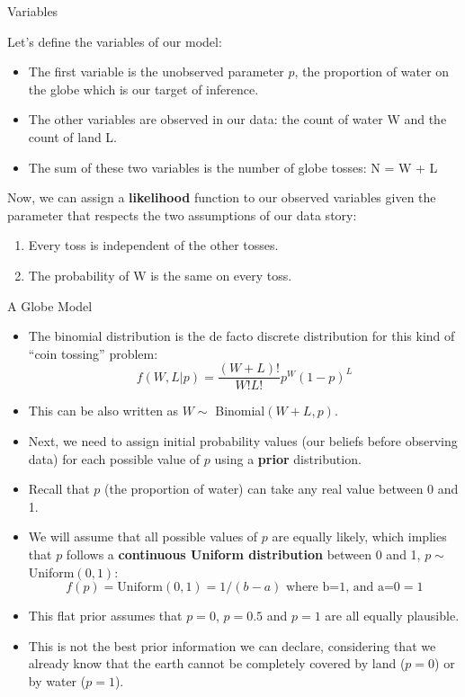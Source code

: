 \documentclass[handout]{beamer}
\begin{document}
\begin{frame}{Variables}
\scriptsize{
Let's define the variables of our model:
\begin{itemize}
\item The first variable is the unobserved parameter $p$, the proportion of water on the globe which is our target of inference.
\item The other variables are observed in our data: the count of water W and the count of land L. 
\item The sum of these two variables is the number of globe tosses: N = W + L
\end{itemize}
Now, we can assign a \textbf{likelihood} function  to our observed variables given the parameter that respects the two assumptions of our data story:
\begin{enumerate}
 \item  Every toss is independent of the other tosses.
 \item The probability of W is the same on every toss.
\end{enumerate}
} 
 
 

\end{frame}


\begin{frame}{A Globe Model}
\scriptsize{

\begin{itemize}
\item The binomial distribution is the de facto discrete distribution for this kind of ``coin tossing'' problem:
\begin{displaymath}
 f(W,L|p) = \frac{(W+L)!}{W!L!}p^W(1-p)^L
\end{displaymath}

\item This can be also written as $W\sim$ Binomial$(W+L,p)$.

\item Next, we need to assign initial probability values (our beliefs before observing data) for each possible value of $p$ using a \textbf{prior} distribution.
\item Recall that $p$ (the proportion of water) can take any real value between 0 and 1.
\item We will assume that all possible values of $p$ are equally likely, which implies that $p$ follows a \textbf{continuous Uniform distribution} between 0 and 1, $p\sim$Uniform$(0,1)$:
\begin{displaymath}
 f(p) = \text{Uniform}(0,1) = 1/(b-a) \text{ where b=1, and a=0} = 1
\end{displaymath}

\item This flat prior assumes that $p=0$, $p=0.5$ and $p=1$ are all equally plausible.
\item This is not the best prior information we can declare, considering that we already know that the earth cannot be completely covered by land ($p=0$) or by water ($p=1$).

\end{itemize}

} 


\end{frame}
\end{document}
